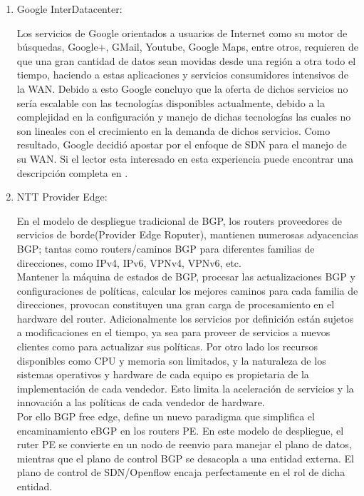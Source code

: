 \begin{enumerate}
\item Google InterDatacenter:

Los servicios de Google orientados a usuarios de Internet como su motor de búsquedas, Google+, GMail, Youtube, Google Maps, entre otros, requieren de que una gran cantidad de datos sean movidas desde una región a otra todo el tiempo, haciendo a estas aplicaciones y servicios consumidores intensivos de la WAN. Debido a esto Google concluyo que la oferta de dichos servicios no sería escalable con las tecnologías disponibles actualmente, debido a la complejidad en la configuración y manejo de dichas tecnologías las cuales no son lineales con el crecimiento en la demanda de dichos servicios. Como resultado, Google decidió apostar por el enfoque de SDN para el manejo de su WAN. Si el lector esta interesado en esta experiencia puede encontrar una descripción completa en \cite{jain2013b4}.

\item NTT Provider Edge:

En el modelo de despliegue tradicional de BGP, los routers  proveedores de servicios de borde(Provider Edge Roputer), mantienen numerosas adyacencias BGP; tantas como routers/caminos BGP para diferentes familias de direcciones, como IPv4, IPv6, VPNv4, VPNv6, etc.\\
 
Mantener la máquina de estados de BGP, procesar las actualizaciones BGP y configuraciones de políticas, calcular los mejores caminos para cada familia de direcciones, provocan constituyen una gran carga de procesamiento en el hardware del router. Adicionalmente los servicios por definición están sujetos a modificaciones en el tiempo, ya sea para proveer de servicios a nuevos clientes como para actualizar sus políticas. Por otro lado los recursos disponibles como CPU y memoria son limitados, y la naturaleza de los sistemas operativos y hardware de cada equipo es propietaria de la implementación de cada vendedor. Esto limita la aceleración de servicios y la innovación a las políticas de cada vendedor de hardware.\\

Por ello BGP free edge, define un nuevo paradigma que simplifica el encaminamiento eBGP en los routers PE. En este modelo de despliegue, el ruter PE se convierte en un nodo de reenvio para manejar el plano de datos, mientras que el plano de control BGP se desacopla a una entidad externa. El plano de control de SDN/Openflow encaja perfectamente en el rol de dicha entidad.\\


\end{enumerate}
